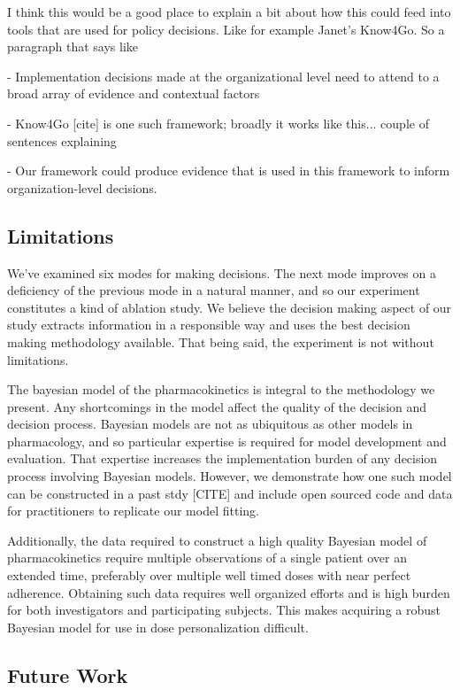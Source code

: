 {\color{red}
I think this would be a good place to explain a bit about how this could feed into tools that are used for policy decisions. Like for example Janet's Know4Go. So a paragraph that says like

- Implementation decisions made at the organizational level need to attend to a broad array of evidence and contextual factors

- Know4Go [cite] is one such framework; broadly it works like this... couple of sentences explaining

- Our framework could produce evidence that is used in this framework to inform organization-level decisions.
}

\subsection{Limitations}

We’ve examined six modes for making decisions.  The next mode improves on a deficiency of the previous mode in a natural manner, and so our experiment constitutes a kind of ablation study.  We believe the decision making aspect of our study extracts information in a responsible way and uses the best decision making methodology available.  That being said, the experiment is not without limitations.

The bayesian model of the pharmacokinetics is integral to the methodology we present.  Any shortcomings in the model affect the quality of the decision and decision process.  Bayesian models are not as ubiquitous as other models in pharmacology, and so particular expertise is required for model development and evaluation.  That expertise increases the implementation burden of any decision process involving Bayesian models.  However, we demonstrate how one such model can be constructed in a past stdy [CITE] and include open sourced code and data for practitioners to replicate our model fitting.

Additionally, the data required to construct a high quality Bayesian model of pharmacokinetics require multiple observations of a single patient over an extended time, preferably over multiple well timed doses with near perfect adherence.  Obtaining such data requires well organized efforts and is high burden for both investigators and participating subjects.  This makes acquiring a robust Bayesian model for use in dose personalization difficult.

\subsection{Future Work}

